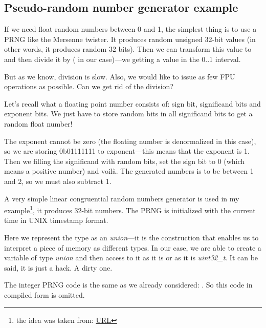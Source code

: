 \subsection{Pseudo-random number generator example}
\label{FPU_PRNG}

If we need float random numbers between 0 and 1, the simplest thing is to use a \ac{PRNG} like
the Mersenne twister. 
It produces random unsigned 32-bit values (in other words, it produces random 32 bits).
Then we can transform this value to \Tfloat and then
divide it by  ( in our case)---we getting a value in the 0..1 interval.

But as we know, division is slow.
Also, we would like to issue as few FPU operations as possible.
Can we get rid of the division?


Let's recall what a floating point number consists of: sign bit, significand bits and exponent bits.
We just have to store random bits in all significand bits to get a random float number!

The exponent cannot be zero (the floating number is denormalized in this case),
so we are storing 0b01111111
to exponent---this means that the exponent is 1. 
Then we filling the significand with random bits, set the sign bit to
0 (which means a positive number) and voilà.
The generated numbers is to be between 1 and 2, so we must also subtract 1.

\newcommand{\URLXOR}{\href{http://xor0110.wordpress.com/2010/09/24/how-to-generate-floating-point-random-numbers-efficiently/}{URL}}

A very simple linear congruential random numbers generator is used in my 
example\footnote{the idea was taken from: \URLXOR}, it produces 32-bit numbers. 
The \ac{PRNG} is initialized with the current time in UNIX timestamp format.

Here we represent the \Tfloat type as an \emph{union}---it is the \CCpp construction that enables us
to interpret a piece of memory as different types.
In our case, we are able to create a variable
of type \emph{union} and then access to it as it is \Tfloat or as it is \emph{uint32\_t}. 
It can be said, it is just a hack. A dirty one.


The integer \ac{PRNG} code is the same as we already considered: .
So this code in compiled form is omitted.



